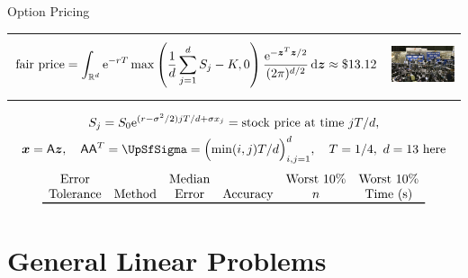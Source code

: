 \documentclass[11pt,compress,xcolor={usenames,dvipsnames},aspectratio=169]{beamer}
\newcommand{\financePict}{\href{http://i2.cdn.turner.com/money/dam/assets/130611131918-chicago-board-options-exchange-1024x576.jpg}{\includegraphics[width
		= 3cm]{ProgramsImages/130611131918-chicago-board-options-exchange-1024x576.jpg}}}
\begin{document}
\begin{frame}{ Option Pricing}
\vspace{-12ex}
\begin{tabular}{m{11cm}m{2.5cm}}
	\[
	\begin{aligned}
	 \text{fair price} = 
	\int_{\mathbb{R}^d}\mathrm{e}^{-r T}\max\left(\frac{1}{d}\sum_{j=1}^d S_{j}-K, 0\right) 
	\frac{\mathrm{e}^{-\boldsymbol{z}^T\boldsymbol{z}/2}}{(2\pi)^{d/2}}\,{\rm d} \boldsymbol{z} \approx \$13.12
	\end{aligned}
	\]
	& 
	\financePict
\end{tabular}
\vspace{-4ex}
\begin{gather*}
S_{j} =  S_0\me^{(r-\sigma^2/2)jT/d+\sigma x_j} = \text{stock price at time } 
jT/d, \\
\vx  = \mA \vz, \quad \mA \mA^T = \mSigma = \Bigl ( \min(i,j) T/d \Bigr) _{i,j = 1}^d,
\quad T = 1/4, \ d=13 \text{ here}
\end{gather*}
\begin{equation*}
\begin{array}{cccccccc}
\text{Error}& && \text{Median}&& \text{Worst 10\%} & \text{Worst 10\%} \\
\text{Tolerance} & \multicolumn{2}{c}{\text{Method}}  & \text{Error} & \text{Accuracy} 
& n & \text{Time (s)} \\
\toprule

\end{array}
\end{equation*}
\vspace{-8ex}

\end{frame}


\section{General Linear Problems}
\end{document}
